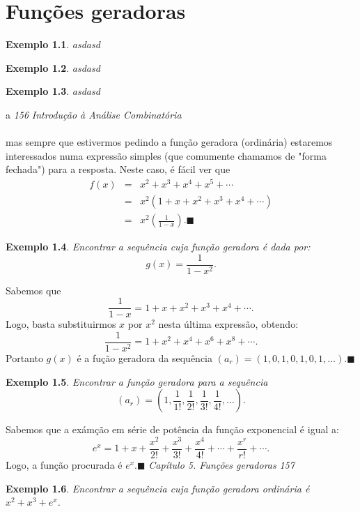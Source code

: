\documentclass[a4paper,12pt]{book}
\newtheorem{exemplo}{Exemplo}[chapter]
\begin{document}
\chapter{Funções geradoras}
\begin{exemplo}
asdasd
\end{exemplo}
\begin{exemplo}
asdasd
\end{exemplo}
\begin{exemplo}
asdasd
\end{exemplo}
\newpage
a
\newpage
\thispagestyle{empty}
\hspace{-0.6cm}\textit{156}
\hfill
\textit{Introdução à Análise Combinatória}
\\\\
mas sempre que estivermos pedindo a função geradora (ordinária) estaremos interessados numa expressão simples (que comumente chamamos de "forma fechada") para a resposta. Neste caso, é fácil ver que
\begin{eqnarray}
f(x) & = & x^2+x^3+x^4+x^5+ \cdots \nonumber \\
& = &x^2(1+x+x^2+x^3+x^4+ \cdots ) \nonumber \\
& = & x^2\left(\frac{1}{1-x}\right).\blacksquare \nonumber 
\end{eqnarray}
\begin{exemplo}
Encontrar a sequência cuja função geradora é dada por:
$$g(x)=\frac{1}{1-x^2}.$$
\end{exemplo}
Sabemos que 
$$\frac{1}{1-x}=1+x+x^2+x^3+x^4+ \cdots .$$
Logo, basta substituirmos $x$ por $x^2$ nesta última expressão, obtendo:
$$\frac{1}{1-x^2}=1+x^2+x^4+x^6+x^8+ \cdots .$$
Portanto $g(x)$ é a fução geradora da sequência $(a_r)=(1,0,1,0,1,0,1,\dots).\blacksquare$
\begin{exemplo}\label{func:ger}
Encontrar a função geradora para a sequência
$$(a_r)=\left(1,\frac{1}{1!},\frac{1}{2!},\frac{1}{3!},\frac{1}{4!},\dots \right).$$
\end{exemplo}
Sabemos que a exámção em série de potência da função exponencial é igual a:
$$e^x=1+x+\frac{x^2}{2!}+\frac{x^3}{3!}+\frac{x^4}{4!}+\cdots +\frac{x^r}{r!}+\cdots .$$
Logo, a função procurada é $e^x.\blacksquare$
\newpage
\thispagestyle{empty}
\hspace{-0.6cm}\textit{Capítulo 5. Funções geradoras}
\hfill
\textit{157}
\\
\begin{exemplo}
Encontrar a sequência cuja função geradora ordinária é $ x^2+x^3+e^x$.
\end{exemplo}
\end{document}

